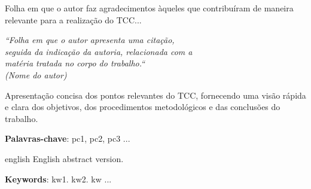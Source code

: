 \documentclass{ifto-tex}
\begin{document}
\begin{agradecimentos}
	Folha em que o autor faz agradecimentos àqueles que contribuíram de maneira relevante para a realização do TCC...
\end{agradecimentos}


\begin{epigrafe}
	\vspace*{\fill}
	\begin{flushright}
		\textit{
			``Folha em que o autor apresenta uma citação,\\
			seguida da indicação da autoria, relacionada com a\\
			matéria tratada no corpo do trabalho.``\\
			(Nome do autor)
		}
	\end{flushright}
\end{epigrafe}


\setlength{\absparsep}{18pt} %

\begin{resumo}
	Apresentação concisa dos pontos relevantes do TCC, fornecendo uma visão rápida e clara dos objetivos, dos procedimentos metodológicos e das conclusões do trabalho.
	
	\textbf{Palavras-chave}: pc1, pc2, pc3 ...
\end{resumo}

\begin{resumo}[Abstract]
	\begin{otherlanguage*}{english}
		English abstract version.
		
		\noindent 
		\textbf{Keywords}: kw1. kw2. kw ...
	\end{otherlanguage*}
\end{resumo}


\listoffigures*
\cleardoublepage
\end{document}
